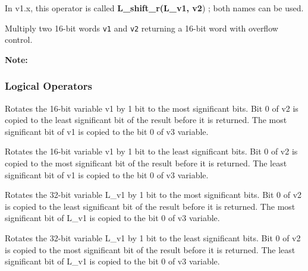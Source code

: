 In v1.x, this operator is called \textbf{L\_shift\_r(L\_v1, v2}) ;
both names can be used.


Multiply two 16-bit words {\tt v1} and {\tt v2} returning a 16-bit
word with overflow control.

\textbf{Note:} \hfill {}

\subsubsection{Logical Operators}

 

Rotates the 16-bit variable v1 by 1 bit to the most significant
bits. Bit 0 of v2 is copied to the least significant bit of the
result before it is returned. The most significant bit of v1 is
copied to the bit 0 of v3 variable.

 

Rotates the 16-bit variable v1 by 1 bit to the least significant
bits. Bit 0 of v2 is copied to the most significant bit of the
result before it is returned. The least significant bit of v1 is
copied to the bit 0 of v3 variable.


 

Rotates the 32-bit variable L\_v1 by 1 bit to the most significant
bits. Bit 0 of v2 is copied to the least significant bit of the
result before it is returned. The most significant bit of L\_v1 is
copied to the bit 0 of v3 variable.


 

Rotates the 32-bit variable L\_v1 by 1 bit to the least
significant bits. Bit 0 of v2 is copied to the most significant
bit of the result before it is returned. The least significant bit
of L\_v1 is copied to the bit 0 of v3 variable.


